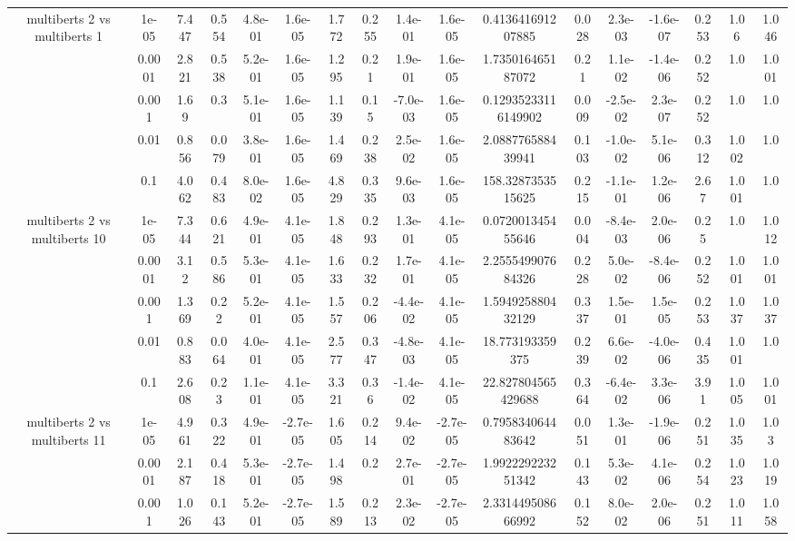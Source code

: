 \begin{tabular}{|c|c|c|c|c|c|c|c|c|c|c|c|c|c|c|c|c|}
\hline
\multirow{5}{*}{multiberts 2 vs multiberts 1} & 1e-05 & 7.447 & 0.554 & 4.8e-01 & 1.6e-05 & 1.772 & 0.255 & 1.4e-01 & 1.6e-05 & 0.413641691207885 & 0.028 & 2.3e-03 & -1.6e-07 & 0.253 & 1.06 & 1.046 \\
 & 0.0001 & 2.821 & 0.538 & 5.2e-01 & 1.6e-05 & 1.295 & 0.21 & 1.9e-01 & 1.6e-05 & 1.735016465187072 & 0.21 & 1.1e-02 & -1.4e-06 & 0.252 & 1.0 & 1.001 \\
 & 0.001 & 1.69 & 0.3 & 5.1e-01 & 1.6e-05 & 1.139 & 0.15 & -7.0e-03 & 1.6e-05 & 0.12935233116149902 & 0.009 & -2.5e-02 & 2.3e-07 & 0.252 & 1.0 & 1.0 \\
 & 0.01 & 0.856 & 0.079 & 3.8e-01 & 1.6e-05 & 1.469 & 0.238 & 2.5e-02 & 1.6e-05 & 2.088776588439941 & 0.103 & -1.0e-02 & 5.1e-06 & 0.312 & 1.002 & 1.0 \\
 & 0.1 & 4.062 & 0.483 & 8.0e-02 & 1.6e-05 & 4.829 & 0.335 & 9.6e-03 & 1.6e-05 & 158.3287353515625 & 0.215 & -1.1e-01 & 1.2e-06 & 2.67 & 1.001 & 1.0 \\
\hline
\multirow{5}{*}{multiberts 2 vs multiberts 10} & 1e-05 & 7.344 & 0.621 & 4.9e-01 & 4.1e-05 & 1.848 & 0.293 & 1.3e-01 & 4.1e-05 & 0.072001345455646 & 0.004 & -8.4e-03 & 2.0e-06 & 0.25 & 1.0 & 1.012 \\
 & 0.0001 & 3.12 & 0.586 & 5.3e-01 & 4.1e-05 & 1.633 & 0.232 & 1.7e-01 & 4.1e-05 & 2.255549907684326 & 0.228 & 5.0e-02 & -8.4e-06 & 0.252 & 1.001 & 1.001 \\
 & 0.001 & 1.369 & 0.22 & 5.2e-01 & 4.1e-05 & 1.557 & 0.206 & -4.4e-02 & 4.1e-05 & 1.594925880432129 & 0.337 & 1.5e-01 & 1.5e-05 & 0.253 & 1.037 & 1.037 \\
 & 0.01 & 0.883 & 0.064 & 4.0e-01 & 4.1e-05 & 2.577 & 0.347 & -4.8e-03 & 4.1e-05 & 18.773193359375 & 0.239 & 6.6e-02 & -4.0e-06 & 0.435 & 1.001 & 1.0 \\
 & 0.1 & 2.608 & 0.23 & 1.1e-01 & 4.1e-05 & 3.321 & 0.36 & -1.4e-02 & 4.1e-05 & 22.827804565429688 & 0.364 & -6.4e-02 & 3.3e-06 & 3.91 & 1.005 & 1.001 \\
\hline
\multirow{5}{*}{multiberts 2 vs multiberts 11} & 1e-05 & 4.961 & 0.322 & 4.9e-01 & -2.7e-05 & 1.605 & 0.214 & 9.4e-02 & -2.7e-05 & 0.795834064483642 & 0.051 & 1.3e-01 & -1.9e-06 & 0.251 & 1.035 & 1.03 \\
 & 0.0001 & 2.187 & 0.418 & 5.3e-01 & -2.7e-05 & 1.498 & 0.2 & 2.7e-01 & -2.7e-05 & 1.992229223251342 & 0.143 & 5.3e-02 & 4.1e-06 & 0.254 & 1.023 & 1.019 \\
 & 0.001 & 1.026 & 0.143 & 5.2e-01 & -2.7e-05 & 1.589 & 0.213 & 2.3e-02 & -2.7e-05 & 2.331449508666992 & 0.152 & 8.0e-02 & 2.0e-06 & 0.251 & 1.011 & 1.058 \\

\end{tabular}
